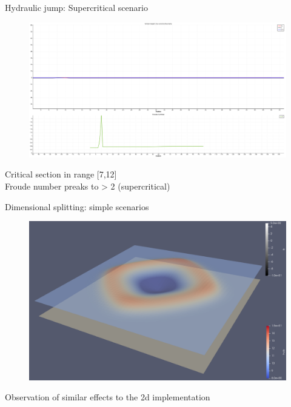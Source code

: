 \documentclass[shortpres]{beamer}
\newcommand{\imgfullscale}{0.75}
\begin{document}
\begin{frame}{Hydraulic jump: Supercritical scenario}
	\begin{figure}
		\includegraphics[clip, width=\imgfullscale\linewidth]{img/Supcritical.png}
	\end{figure}
	Critical section in range [7,12]\\
	Froude number preaks to > 2 (supercritical)
\end{frame}

\begin{frame}{Dimensional splitting: simple scenarios}
	\begin{figure}
			\includegraphics[clip, width=\imgfullscale\linewidth]{img/3d_bathy.png}
	\end{figure}
	Observation of similar effects to the 2d implementation
\end{frame}
\end{document}
